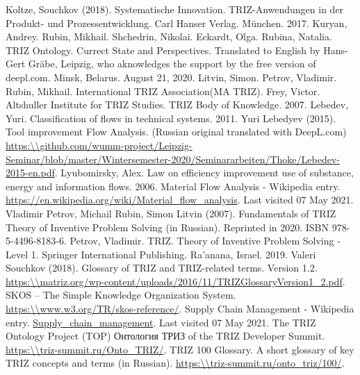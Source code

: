 \documentclass[a4paper,11pt]{article}
\begin{document}
\begin{itemize}
\begin{thebibliography}{...}
     Koltze, Souchkov (2018). Systematische Innovation. TRIZ-Anwendungen in der Produkt- und Prozessentwicklung. Carl Hanser Verlag. München. 2017.
     Kuryan, Andrey. Rubin, Mikhail. Shchedrin, Nikolai. Eckardt, Olga. Rubina, Natalia. TRIZ Ontology. Currect State and Perspectives. Translated to English by Hans-Gert Gräbe, Leipzig, who aknowledges the support by the free version of deepl.com. Minsk, Belarus. August 21, 2020.
     Litvin, Simon. Petrov, Vladimir. Rubin, Mikhail. International TRIZ Association(MA TRIZ). Frey, Victor. Altshuller Institute for TRIZ Studies. TRIZ Body of Knowledge. 2007.
     Lebedev, Yuri. Classification of flows in technical systems. 2011.
     Yuri Lebedyev (2015). Tool improvement Flow Analysis. (Russian original translated with DeepL.com)
      \url{https:\\github.com/wumm-project/Leipzig-Seminar/blob/master/Wintersemester-2020/Seminararbeiten/Thoke/Lebedev-2015-en.pdf}.
     Lyubomirsky, Alex. Law on efficiency improvement use of substance, energy and information flows. 2006.
     Material Flow Analysis - Wikipedia entry.
        \url{https://en.wikipedia.org/wiki/Material_flow_analysis}. Last visited 07 May 2021.
     Vladimir Petrov, Michail Rubin, Simon Litvin (2007). Fundamentals of TRIZ Theory of Inventive Problem Solving (in Russian). Reprinted in 2020. ISBN 978-5-4496-8183-6.
     Petrov, Vladimir. TRIZ. Theory of Inventive Problem Solving - Level 1. Springer International Publishing. Ra'anana, Israel. 2019.
     Valeri Souchkov (2018).  Glossary of TRIZ and TRIZ-related terms. Version 1.2.
        \url{https:\\matriz.org/wp-content/uploads/2016/11/TRIZGlossaryVersion1_2.pdf}. 
     SKOS -- The Simple Knowledge Organization System.
        \url{https:\\www.w3.org/TR/skos-reference/}.
     Supply Chain Management - Wikipedia entry.
        \url{Supply_chain_management}. Last visited 07 May 2021.
     The TRIZ Ontology Project (TOP) \foreignlanguage{russian}{Онтология ТРИЗ} of the TRIZ Developer Summit.
        \url{https:\\triz-summit.ru/Onto_TRIZ/}.
     TRIZ 100 Glossary. A short glossary of key TRIZ concepts and terms (in Russian).
        \url{https:\\triz-summit.ru/onto_triz/100/}.

\end{thebibliography}
\end{itemize}
\end{document}
